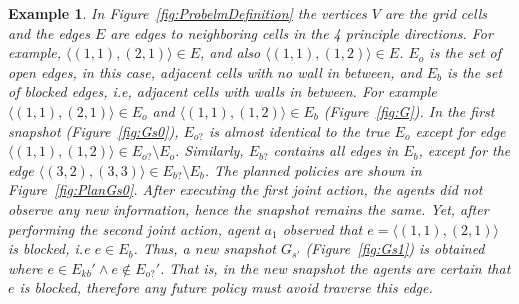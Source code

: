 \documentclass[letterpaper]{article} %
\def\
UrlFont{\rm}  %
\newtheorem{example}{Example}[section] %
\newcommand{\eo}{E_{o}} %
\newcommand{\eb}{E_{b}} %
\newcommand{\eko}{E_{ko}} %
\newcommand{\ekb}{E_{kb}} %
\newcommand{\eao}{E_{o?}} %
\newcommand{\eab}{E_{b?}} %
\theoremstyle{definition}
\begin{document}


\begin{example}
In Figure~\ref{fig:ProbelmDefinition} the vertices $V$ are the grid cells and the edges $E$ are edges to neighboring cells in the 4 principle directions. For example, $\langle (1,1) , (2,1)\rangle \in E$, and also $\langle (1,1) , (1,2)\rangle \in E$. $\eo$ is the set of open edges, in this case, adjacent cells with no wall in between, and $\eb$ is the set of blocked edges, i.e, adjacent cells with walls in between. For example $\langle (1,1) , (2,1)\rangle \in \eo$ and $\langle (1,1) , (1,2)\rangle \in \eb$ (Figure~\ref{fig:G}).
In the first snapshot (Figure~\ref{fig:Gs0}), $\eao$ is almost identical to the true $\eo$ except for edge $\langle (1,1), (1,2) \rangle \in \eao \setminus \eo$. Similarly, $\eab$ contains all edges in $\eb$, except for the edge $\langle (3,2), (3,3) \rangle \in \eab \setminus \eb$.
The planned policies are shown in Figure~\ref{fig:PlanGs0}. After executing the first joint action, the agents did not observe any new information, hence the snapshot remains the same. Yet, after performing the second joint action, agent $a_1$ observed that $e=\langle (1,1) , (2,1)\rangle$ is blocked, i.e $e \in \eb$. Thus, a new snapshot $G_{s'}$ (Figure~\ref{fig:Gs1}) is obtained where $e \in \ekb' \land e \notin \eao'$. That is, in the new snapshot the agents are certain that $e$ is blocked, therefore any future policy must avoid traverse this edge.
\end{example}
\end{document}
